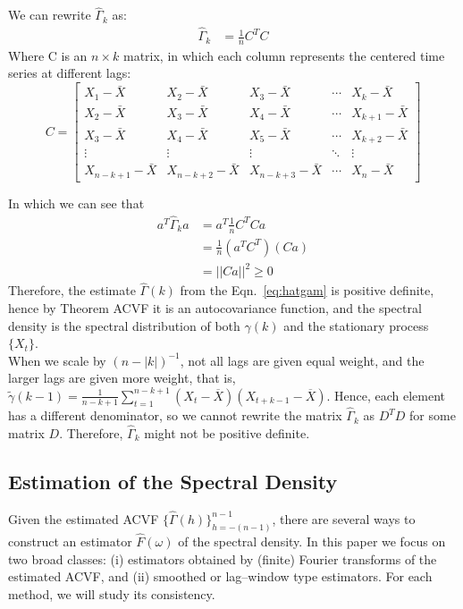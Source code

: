 \documentclass[preprint]{aastex}
\theoremstyle{nonitalicname}
\theoremstyle{plain}
\theoremstyle{remark}
\begin{document}
We can rewrite $\widehat \Gamma_k$ as: 
\begin{equation}
\begin{aligned}
    \widehat \Gamma_k &= \frac{1}{n} C^TC
\end{aligned}
\end{equation}
Where C is an $n \times k $ matrix, in which each column represents the centered time series at different lags:
$$C = \begin{bmatrix}
X_1 - \bar{X} & X_2 - \bar{X} & X_3 - \bar{X} & \cdots & X_k - \bar{X} \\
X_2 - \bar{X} & X_3 - \bar{X} & X_4 - \bar{X} & \cdots & X_{k+1} - \bar{X} \\
X_3 - \bar{X} & X_4 - \bar{X} & X_5 - \bar{X} & \cdots & X_{k+2} - \bar{X} \\
\vdots & \vdots & \vdots & \ddots & \vdots \\
X_{n-k+1} - \bar{X} & X_{n-k+2} - \bar{X} & X_{n-k+3} - \bar{X} & \cdots & X_n - \bar{X}
\end{bmatrix}$$

In which we can see that
\begin{equation}
    \begin{aligned}
        a^T \widehat \Gamma_k a &= a^T \frac{1}{n}C^T C a\\
        &= \frac{1}{n} (a^T C^T)(Ca) \\
        &= ||Ca||^2 \geq 0
    \end{aligned}
\end{equation}
Therefore, the estimate $\widehat \Gamma(k)$ from the Eqn.~\ref{eq:hatgam} is positive definite, hence by Theorem ACVF it is an autocovariance function, and the spectral density is the spectral distribution of both $\gamma(k)$ and the stationary process $\{X_t\}$. \\
When we scale by $(n-|k|)^{-1}$, not all lags are given equal weight, and the larger lags are given more weight, that is, $\tilde \gamma (k-1) = \frac{1}{n-k+1} \sum_{t=1}^{n-k+1} (X_t - \overline X)(X_{t+k-1} - \overline X)$. Hence, each element has a different denominator, so we cannot rewrite the matrix $\widehat \Gamma_k$ as $D^TD$ for some matrix $D$. Therefore, $\widehat \Gamma_k$ might not be positive definite.

\subsection{Estimation of the Spectral Density}

Given the estimated ACVF $\{\widehat \Gamma(h)\}_{h=-(n-1)}^{n-1}$, there are several ways to construct
an estimator $\widehat F(\omega)$ of the spectral density. In this paper we
focus on two broad classes: (i) estimators obtained by (finite) Fourier
transforms of the estimated ACVF, and (ii) smoothed or lag--window type
estimators. For each method, we will study its consistency.
\end{document}
